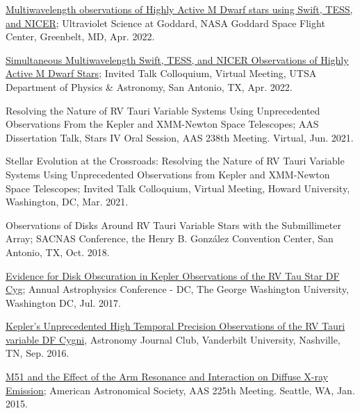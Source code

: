 \documentclass[12pt]{article}
\begin{document}
\begin{etaremune}
\item \href{https://asd.gsfc.nasa.gov/conferences/UVsymposium2022/agenda/}{Multiwavelength observations of Highly Active M Dwarf stars using Swift, TESS, and NICER}; Ultraviolet Science at Goddard, NASA Goddard Space Flight Center, Greenbelt, MD, Apr. 2022.

\item \href{https://twitter.com/UTSA_PhyAst/status/1508503792261779464?s=20&t=dVQ_0wPfIXmUPicaAi6VLg}{Simultaneous Multiwavelength Swift, TESS, and NICER Observations of Highly Active M Dwarf Stars}; Invited Talk Colloquium, Virtual Meeting, UTSA Department of Physics \& Astronomy, San Antonio, TX, Apr. 2022. 

\item Resolving the Nature of RV Tauri Variable Systems Using Unprecedented Observations From the Kepler and XMM-Newton Space Telescopes; AAS Dissertation Talk, Stars IV Oral Session, AAS 238th Meeting. Virtual, Jun. 2021.

\item Stellar Evolution at the Crossroads: Resolving the Nature of RV Tauri Variable Systems Using Unprecedented Observations from Kepler and XMM-Newton Space Telescopes; Invited Talk Colloquium, Virtual Meeting, Howard University, Washington, DC, Mar. 2021.

\item Observations of Disks Around RV Tauri Variable Stars with the Submillimeter Array; SACNAS Conference, the Henry B. Gonz\'alez Convention Center, San Antonio, TX, Oct. 2018.

\item \href{https://physics.columbian.gwu.edu/sites/g/files/zaxdzs1976/f/downloads/ACDC2017_Agenda_0.pdf}{Evidence for Disk Obscuration in Kepler Observations of the RV Tau Star DF Cyg};  Annual Astrophysics Conference - DC, The George Washington University, Washington DC, Jul. 2017.

\item \href{https://as.vanderbilt.edu/astronomy/2016/08/journal-club-fall-2016/}{Kepler's Unprecedented High Temporal Precision Observations of the RV Tauri variable DF Cygni}, Astronomy Journal Club, Vanderbilt University, Nashville, TN, Sep. 2016.

\item \href{http://adsabs.harvard.edu/abs/2015AAS...22522708V}{M51 and the Effect of the Arm Resonance and Interaction on Diffuse X-ray Emission}; American Astronomical Society, AAS 225th Meeting. Seattle, WA, Jan. 2015.


\end{etaremune}
\end{document}
